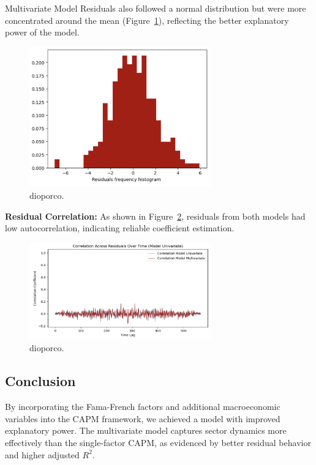 Multivariate Model Residuals also followed a normal distribution but were more concentrated around the mean 
(Figure~\ref{fig:7_7}), reflecting the better explanatory power of the model.

\begin{figure}[h!]
    \centering
    \includegraphics[width=0.7\textwidth]{images/7_7.png}
    \caption{dioporco.}\label{fig:7_7}
\end{figure}

\textbf{Residual Correlation:} As shown in Figure~\ref{fig:7_8}, residuals from both models had low autocorrelation, 
indicating reliable coefficient estimation.

\begin{figure}[h!]
    \centering
    \includegraphics[width=0.7\textwidth]{images/7_8.png}
    \caption{dioporco.}\label{fig:7_8}
\end{figure}


\subsection*{Conclusion}
By incorporating the Fama-French factors and additional macroeconomic variables into the CAPM framework, we achieved a model
with improved explanatory power.
The multivariate model captures sector dynamics more effectively than the single-factor CAPM, as evidenced by better residual 
behavior and higher adjusted $R^2$.



